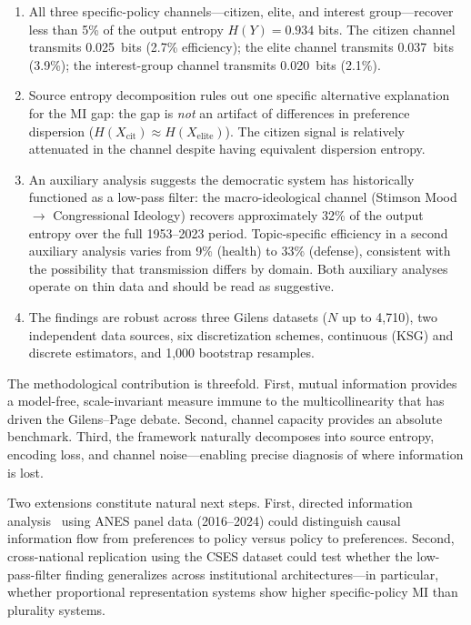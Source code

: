 \documentclass[twocolumn,10pt]{article}
\begin{document}
\begin{enumerate}
\item All three specific-policy channels---citizen, elite, and interest group---recover less than 5\% of the output entropy $H(Y) = 0.934$ bits.  The citizen channel transmits 0.025~bits (2.7\% efficiency); the elite channel transmits 0.037~bits (3.9\%); the interest-group channel transmits 0.020~bits (2.1\%).

\item Source entropy decomposition rules out one specific alternative explanation for the MI gap: the gap is \emph{not} an artifact of differences in preference dispersion ($H(X_\text{cit}) \approx H(X_\text{elite})$).  The citizen signal is relatively attenuated in the channel despite having equivalent dispersion entropy.

\item An auxiliary analysis suggests the democratic system has historically functioned as a low-pass filter: the macro-ideological channel (Stimson Mood $\to$ Congressional Ideology) recovers approximately 32\% of the output entropy over the full 1953--2023 period.  Topic-specific efficiency in a second auxiliary analysis varies from 9\% (health) to 33\% (defense), consistent with the possibility that transmission differs by domain.  Both auxiliary analyses operate on thin data and should be read as suggestive.

\item The findings are robust across three Gilens datasets ($N$ up to 4,710), two independent data sources, six discretization schemes, continuous (KSG) and discrete estimators, and 1,000 bootstrap resamples.
\end{enumerate}

The methodological contribution is threefold.  First, mutual information provides a model-free, scale-invariant measure immune to the multicollinearity that has driven the Gilens--Page debate.  Second, channel capacity provides an absolute benchmark.  Third, the framework naturally decomposes into source entropy, encoding loss, and channel noise---enabling precise diagnosis of where information is lost.

Two extensions constitute natural next steps.  First, directed information analysis~\citep{massey1990} using ANES panel data (2016--2024) could distinguish causal information flow from preferences to policy versus policy to preferences.  Second, cross-national replication using the CSES dataset could test whether the low-pass-filter finding generalizes across institutional architectures---in particular, whether proportional representation systems show higher specific-policy MI than plurality systems.
\end{document}
